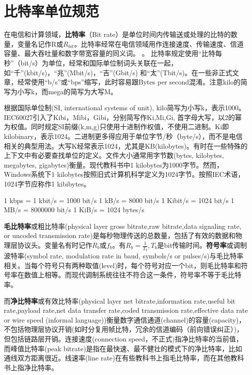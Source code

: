 

\section{比特率单位规范}

在电信和计算领域，\textbf{比特率}（Bit rate）是单位时间内传输送或处理的比特的数量，变量名记作R\cite{wikipedia}或$R_{bit}$\cite{weijipedia}。比特率经常在电信领域用作连接速度、传输速度、信道容量、最大吞吐量和数字带宽容量的同义词。
。
比特率规定使用“比特每秒”（bit/s）为单位，经常和国际单位制词头关联在一起，如“千”(kbit/s)，“兆”(Mbit/s)，“吉”(Gbit/s) 和“太”(Tbit/s)。在一些非正式文章，经常使用“b/s”或“bps”缩写，此时容易跟Bytes per second混淆。注意kilo的简写为小写k，而mega的简写为大写M。

根据国际单位制(SI, international systems of unit), kilo简写为小写k，表示1000。IEC60027引入了Kibi，Mibi，Gibi，分别简写作Ki,Mi,Gi, 首字母大写，以2的幂为权值。同时规定SI前缀(k,m,g)只使用十进制作权值，不使用二进制。Ki即kilobinary，表示1024。二进制更多得应用于单位字节/秒（byte/s），而不是电信相关的典型用法。大写K经常表示1024，尤其是KB(kilobytes)。有时在一些特殊的上下文中有必要查找单位的定义。文件大小通常用字节数(bytes, kilobytes, megabytes, gigabytes)衡量。现代教科书中1 kilobytes为1000字节。然而，Windows系统下1 kilobytes按照旧式计算机科学定义为1024字节。按照IEC术语，1024字节应称作1 kibibytes。

\begin{center}
1 kbps = 1 kbit/s = 1000 bit/s
1 kB/s = 8000 bit/s
1 Kibit/s = 1024 bit/s
1 MB/s = 8000000 bit/s
1 KiB/s = 1024 bytes/s
\end{center}


\textbf{毛比特率}或粗比特率(physical layer gross bitrate,raw bitrate,data signaling rate, or uncoded transmission rate)是每秒物理传送的总数量，包括了有效的数据和物理层协议头。变量名有时记作$R_b$或$f_b$。有$R_b = \frac{1}{T_b},T_b$是bit传输时间。\textbf{符号率}或调制波特率(symbol rate, modulation rate in baud, symbols/s or pulses/s)与毛比特率相关。当每个符号只有两种取值(level)时，每个符号对应一个bit，则毛比特率和符号率在数值上相等。而现代调制系统往往不符合这一条件，符号率不等于毛比特率。

而\textbf{净比特率}或有效比特率(physical layer net bitrate,information rate,useful bit rate,payload rate,net data transfer rate,coded transmission rate,effective data rate or wire speed (informal language))衡量数字通信通道(channel)的容量(capacity)，不包括物理层协议开销(如时分复用帧比特，冗余的信道编码（前向错误纠正）)，但包括链路层开销。连接速度(connection speed，不正式)指净比特率的当前值，而峰值比特率(peak bitrate)是指在最快速、最不健壮的模式下的净比特率，比如通线双方距离很近。线速率(line rate)在有些教科书上指毛比特率，而在其他教科书上指净比特率。

